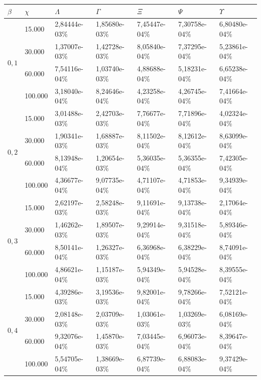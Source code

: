 \begin{table}[!ht]
\begin{center}
\begin{tabular}{|l|l|l|l|l|l|l|} %
\hline
$\beta$ & $\chi$ & $\Lambda$ & $\Gamma$ & $\Xi$ & $\Psi$ & $\Upsilon$ \\
\hline %
\multirow{4}{*}{$0,1$}
& 15.000 & 2,84444e-03\% & 1,85680e-03\% & 7,45447e-04\% & 7,30758e-04\% & 6,80480e-04\% \\
& 30.000 & 1,37007e-03\% & 1,42728e-03\% & 8,05840e-04\% & 7,37295e-04\% & 5,23861e-04\% \\
& 60.000 & 7,54116e-04\% & 1,03740e-03\% & 4,88688e-04\% & 5,18231e-04\% & 6,65238e-04\% \\
& 100.000 & 3,18040e-04\% & 8,24646e-04\% & 4,23258e-04\% & 4,26745e-04\% & 7,41664e-04\% \\
\hline %
\multirow{4}{*}{$0,2$}
& 15.000 & 3,01488e-03\% & 2,42703e-03\% & 7,76677e-04\% & 7,71896e-04\% & 4,02324e-04\% \\
& 30.000 & 1,90341e-03\% & 1,68887e-03\% & 8,11502e-04\% & 8,12612e-04\% & 8,63099e-04\% \\
& 60.000 & 8,13948e-04\% & 1,20654e-03\% & 5,36035e-04\% & 5,36355e-04\% & 7,42305e-04\% \\
& 100.000 & 4,36677e-04\% & 9,07735e-04\% & 4,71107e-04\% & 4,71853e-04\% & 9,34939e-04\% \\
\hline %
\multirow{4}{*}{$0,3$}
& 15.000 & 2,62197e-03\% & 2,58248e-03\% & 9,11691e-04\% & 9,13738e-04\% & 2,17064e-04\% \\
& 30.000 & 1,46262e-03\% & 1,89507e-03\% & 9,29914e-04\% & 9,31518e-04\% & 5,89346e-04\% \\
& 60.000 & 8,50141e-04\% & 1,26327e-03\% & 6,36968e-04\% & 6,38229e-04\% & 8,74091e-04\% \\
& 100.000 & 4,86621e-04\% & 1,15187e-03\% & 5,94349e-04\% & 5,94528e-04\% & 8,39555e-04\%\\
\hline %
\multirow{4}{*}{$0,4$}
& 15.000 & 4,39286e-03\% & 3,19536e-03\% & 9,82001e-04\% & 9,78266e-04\% & 7,52121e-04\% \\
& 30.000 & 2,08148e-03\% & 2,03709e-03\% & 1,03061e-03\% & 1,03269e-03\% & 6,08169e-04\% \\
& 60.000 & 9,32076e-04\% & 1,45870e-03\% & 7,03445e-04\% & 6,96073e-04\% & 8,39647e-04\% \\
& 100.000 & 5,54705e-04\% & 1,38669e-03\% & 6,87739e-04\% & 6,88083e-04\% & 9,37429e-04\% \\

\end{tabular}
\end{center}
\end{table}
